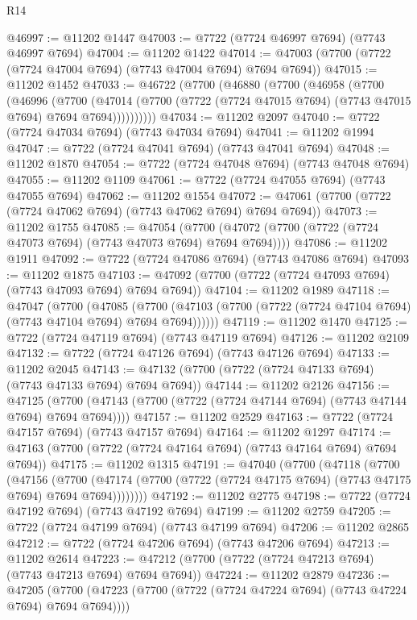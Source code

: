 \begin{lexlean}{R14}
\begin{coremodule}
@46997 := @11202 @1447
@47003 := @7722 (@7724 @46997 @7694) (@7743 @46997 @7694)
@47004 := @11202 @1422
@47014 := @47003 (@7700 (@7722 (@7724 @47004 @7694) (@7743 @47004 @7694) @7694 @7694))
@47015 := @11202 @1452
@47033 := @46722
    (@7700
      (@46880
        (@7700
          (@46958
            (@7700
              (@46996
                (@7700
                  (@47014
                    (@7700 (@7722 (@7724 @47015 @7694) (@7743 @47015 @7694) @7694 @7694))))))))))
@47034 := @11202 @2097
@47040 := @7722 (@7724 @47034 @7694) (@7743 @47034 @7694)
@47041 := @11202 @1994
@47047 := @7722 (@7724 @47041 @7694) (@7743 @47041 @7694)
@47048 := @11202 @1870
@47054 := @7722 (@7724 @47048 @7694) (@7743 @47048 @7694)
@47055 := @11202 @1109
@47061 := @7722 (@7724 @47055 @7694) (@7743 @47055 @7694)
@47062 := @11202 @1554
@47072 := @47061 (@7700 (@7722 (@7724 @47062 @7694) (@7743 @47062 @7694) @7694 @7694))
@47073 := @11202 @1755
@47085 := @47054
    (@7700 (@47072 (@7700 (@7722 (@7724 @47073 @7694) (@7743 @47073 @7694) @7694 @7694))))
@47086 := @11202 @1911
@47092 := @7722 (@7724 @47086 @7694) (@7743 @47086 @7694)
@47093 := @11202 @1875
@47103 := @47092 (@7700 (@7722 (@7724 @47093 @7694) (@7743 @47093 @7694) @7694 @7694))
@47104 := @11202 @1989
@47118 := @47047
    (@7700
      (@47085
        (@7700 (@47103 (@7700 (@7722 (@7724 @47104 @7694) (@7743 @47104 @7694) @7694 @7694))))))
@47119 := @11202 @1470
@47125 := @7722 (@7724 @47119 @7694) (@7743 @47119 @7694)
@47126 := @11202 @2109
@47132 := @7722 (@7724 @47126 @7694) (@7743 @47126 @7694)
@47133 := @11202 @2045
@47143 := @47132 (@7700 (@7722 (@7724 @47133 @7694) (@7743 @47133 @7694) @7694 @7694))
@47144 := @11202 @2126
@47156 := @47125
    (@7700 (@47143 (@7700 (@7722 (@7724 @47144 @7694) (@7743 @47144 @7694) @7694 @7694))))
@47157 := @11202 @2529
@47163 := @7722 (@7724 @47157 @7694) (@7743 @47157 @7694)
@47164 := @11202 @1297
@47174 := @47163 (@7700 (@7722 (@7724 @47164 @7694) (@7743 @47164 @7694) @7694 @7694))
@47175 := @11202 @1315
@47191 := @47040
    (@7700
      (@47118
        (@7700
          (@47156
            (@7700
              (@47174 (@7700 (@7722 (@7724 @47175 @7694) (@7743 @47175 @7694) @7694 @7694))))))))
@47192 := @11202 @2775
@47198 := @7722 (@7724 @47192 @7694) (@7743 @47192 @7694)
@47199 := @11202 @2759
@47205 := @7722 (@7724 @47199 @7694) (@7743 @47199 @7694)
@47206 := @11202 @2865
@47212 := @7722 (@7724 @47206 @7694) (@7743 @47206 @7694)
@47213 := @11202 @2614
@47223 := @47212 (@7700 (@7722 (@7724 @47213 @7694) (@7743 @47213 @7694) @7694 @7694))
@47224 := @11202 @2879
@47236 := @47205
    (@7700 (@47223 (@7700 (@7722 (@7724 @47224 @7694) (@7743 @47224 @7694) @7694 @7694))))

\end{coremodule}
\end{lexlean}
